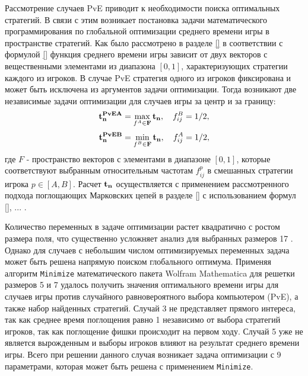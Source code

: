 Рассмотрение случаев PvE приводит к необходимости поиска оптимальных стратегий. В связи с этим возникает постановка задачи 
математического программирования по глобальной оптимизации среднего времени игры в пространстве стратегий. 
Как было рассмотрено в разделе \cref{} в соответствии с формулой \cref{} функция среднего времени игры
зависит от двух векторов с вещественными элементами из диапазона $[0, 1]$, характеризующих стратегии каждого из игроков.
В случае PvE стратегия одного из игроков фиксирована и может быть исключена из аргументов задачи оптимизации.
Тогда возникают две независимые задачи оптимизации для случаев игры за центр и за границу:
\begin{equation}
    \begin{aligned}
    {\bf t_n^{PvEA}} = \max_{f^A \in {\bf F}} {\bf t_n}, \hspace{1em} f_{ij}^B=1/2,
    \label{eq:centeropt}
    \end{aligned}
\end{equation}
\begin{equation}
    \begin{aligned}
    {\bf t_n^{PvEB}} = \min_{f^B \in {\bf F}} {\bf t_n}, \hspace{1em}  f_{ij}^A=1/2,
    \label{eq:borderopt}
    \end{aligned}
\end{equation}
где $F$ - пространство векторов с элементами в диапазоне $[0, 1]$, которые соответствуют выбранным относительным частотам $f_{ij}^p$
в смешанных стратегии игрока $p \in [A, B]$. Расчет ${\bf t_n}$ осуществляется с применением рассмотренного подхода поглощающих Марковских цепей
в разделе \cref{} с использованием формул \cref{}, ... .

Количество переменных в задаче оптимизации растет квадратично с ростом размера поля, что существенно усложняет анализ для выбранных размеров 17 .
Однако для случаев с небольшим числом оптимизируемых переменных задача может быть решена напрямую поиском глобального оптимума.
Применяя алгоритм \texttt{Minimize} математического пакета Wolfram Mathematica для решетки размеров 5 и 7 удалось получить значения
оптимального времени игры для случаев игры против случайного равновероятного выбора компьютером (PvE), а также набор найденных стратегий.
Случай 3  не представляет прямого интереса, так как среднее время поглощения равно 1 независимо от выбора стратегий игроков, 
так как поглощение фишки происходит на первом ходу. Случай 5  уже не является вырожденным и выборы игроков влияют на результат среднего времени игры.
Всего при решении данного случая возникает задача оптимизации с 9 параметрами, которая может быть решена с применением \texttt{Minimize}.

